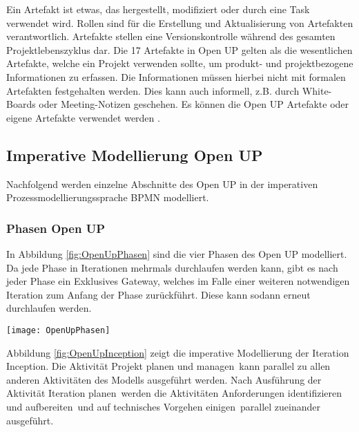 Ein Artefakt ist etwas, das hergestellt, modifiziert oder durch eine Task verwendet wird. Rollen sind 
für die Erstellung und Aktualisierung von Artefakten verantwortlich. Artefakte stellen eine Versionskontrolle während des gesamten Projektlebenszyklus dar. Die 17 Artefakte in Open UP gelten als die wesentlichen Artefakte, welche ein Projekt verwenden sollte, um produkt- und projektbezogene Informationen zu erfassen. Die Informationen müssen hierbei nicht mit formalen Artefakten festgehalten werden. Dies kann auch informell, z.B. durch White-Boards oder Meeting-Notizen geschehen. Es können die Open UP Artefakte oder eigene Artefakte verwendet werden \cite{eclipseopenup}.

\subsection{Imperative Modellierung Open UP}

Nachfolgend werden einzelne Abschnitte des Open UP in der imperativen Prozessmodellierungssprache BPMN modelliert.

 \subsubsection{Phasen Open UP}

In Abbildung \ref{fig:OpenUpPhasen} sind die vier Phasen des Open UP modelliert. Da jede Phase in Iterationen mehrmals durchlaufen werden kann, gibt es nach jeder Phase ein Exklusives Gateway, welches im Falle einer weiteren notwendigen Iteration zum Anfang der Phase zurückführt. Diese kann sodann erneut durchlaufen werden.

\begin{sidewaysfigure}[htp]
\begin{center}
  \texttt{[image: OpenUpPhasen]} %
  \caption{Phasen Open UP- imperativ}
  \label{fig:OpenUpPhasen}
\end{center}
\end{sidewaysfigure}

Abbildung \ref{fig:OpenUpInception} zeigt die imperative Modellierung der Iteration Inception. Die Aktivität \grqq Projekt planen und managen\grqq \ kann parallel zu allen anderen Aktivitäten des Modells ausgeführt werden.\newline
Nach Ausführung der Aktivität \grqq Iteration planen\grqq \ werden die Aktivitäten \grqq Anforderungen identifizieren und aufbereiten\grqq \ und \grqq auf technisches Vorgehen einigen\grqq \ parallel zueinander ausgeführt.

